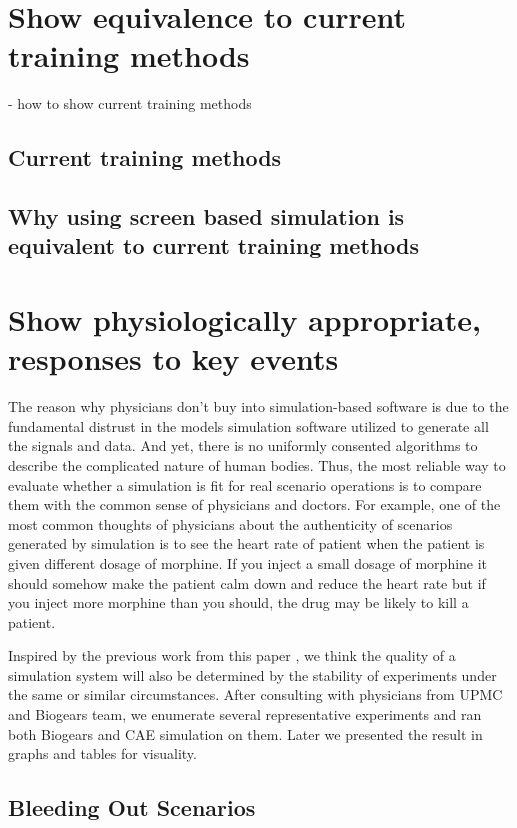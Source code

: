 \documentclass[a4paper]{article}
\begin{document}
\section{Show equivalence to current training methods}

- how to show current training methods

\subsection{Current training methods}
\subsection{Why using screen based simulation is equivalent to current training methods}

\section{Show physiologically appropriate, responses to key events}

The reason why physicians don't buy into simulation-based software is due to the fundamental distrust in the models simulation software utilized to generate all the signals and data. And yet, there is no uniformly consented algorithms to describe the complicated nature of human bodies. Thus, the most reliable way to evaluate whether a simulation is fit for real scenario operations is to compare them with the common sense of physicians and doctors. For example, one of the most common thoughts of physicians about the authenticity of scenarios generated by simulation is to see the heart rate of patient when the patient is given different dosage of morphine. If you inject a small dosage of morphine it should somehow make the patient calm down and reduce the heart rate but if you inject more morphine than you should, the drug may be likely to kill a patient. 

Inspired by the previous work from this paper \cite{measure_repeatability}, we think the quality of a simulation system will also be determined by the stability of experiments under the same or similar circumstances. After consulting with physicians from UPMC and Biogears team, we enumerate several representative experiments and ran both Biogears and CAE simulation on them. Later we presented the result in graphs and tables for visuality.

\subsection{Bleeding Out Scenarios}
\end{document}

